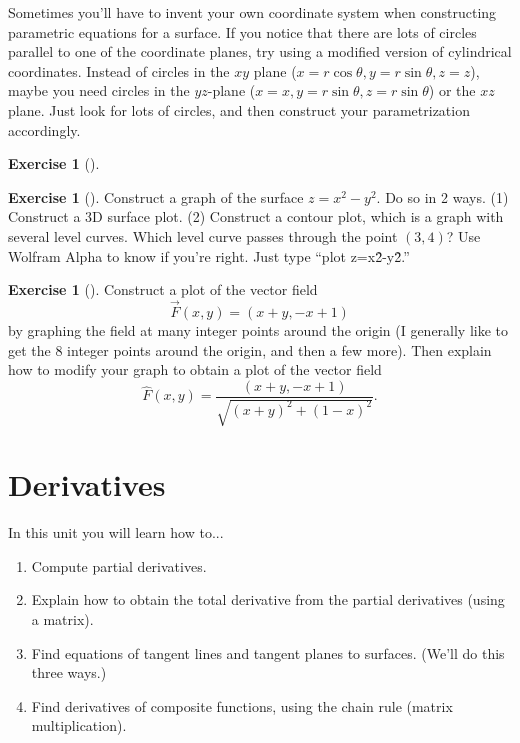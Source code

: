 \documentclass[10pt,]{book}
\theoremstyle{plain}
\theoremstyle{definition}
\theoremstyle{definition}
\theoremstyle{definition}
\theoremstyle{definition}
\newtheorem{exploration}[project]{Exercise}
\theoremstyle{definition}
\numberwithin{equation}{section}
\begin{document}
Sometimes you'll have to invent your own coordinate system when constructing parametric equations for a surface. If you notice that there are lots of circles parallel to one of the coordinate planes, try using a modified version of cylindrical coordinates. Instead of circles in the \(xy\) plane (\(x=r\cos\theta,y=r\sin\theta,z=z\)), maybe you need circles in the \(yz\)-plane (\(x=x,y=r\sin\theta,z=r\sin\theta\)) or the \(xz\) plane. Just look for lots of circles, and then construct your parametrization accordingly.%
\begin{exploration}[]\label{exploration-128}
\end{exploration}
\begin{exploration}[]\label{exploration-129}
Construct a graph of the surface \(z = x^2-y^2\). Do so in 2 ways. (1) Construct a 3D surface plot. (2) Construct a contour plot, which is a graph with several level curves. Which level curve passes through the point \((3,4)\)? Use Wolfram Alpha to know if you're right. Just type ``plot z=x\^2-y\^2.''%
\end{exploration}
\begin{exploration}[]\label{exploration-130}
Construct a plot of the vector field%
\begin{equation*}
\vec F(x,y) = (x+y, -x+1)
\end{equation*}
by graphing the field at many integer points around the origin (I generally like to get the 8 integer points around the origin, and then a few more). Then explain how to modify your graph to obtain a plot of the vector field%
\begin{equation*}
\hat F(x,y) = \frac{(x+y, -x+1)}{\sqrt{(x+y)^2+(1-x)^2}}.
\end{equation*}
%
\end{exploration}
\typeout{************************************************}
\typeout{************************************************}
\chapter[{Derivatives}]{Derivatives}\label{chapter-7}
In this unit you will learn how to... \leavevmode%
\begin{enumerate}
\item\hypertarget{li-69}{}Compute partial derivatives.%
\item\hypertarget{li-70}{}Explain how to obtain the total derivative from the partial derivatives (using a matrix).%
\item\hypertarget{li-71}{}Find equations of tangent lines and tangent planes to surfaces. (We'll do this three ways.)%
\item\hypertarget{li-72}{}Find derivatives of composite functions, using the chain rule (matrix multiplication).%
\end{enumerate}
%
\typeout{************************************************}
\typeout{************************************************}
\end{document}
